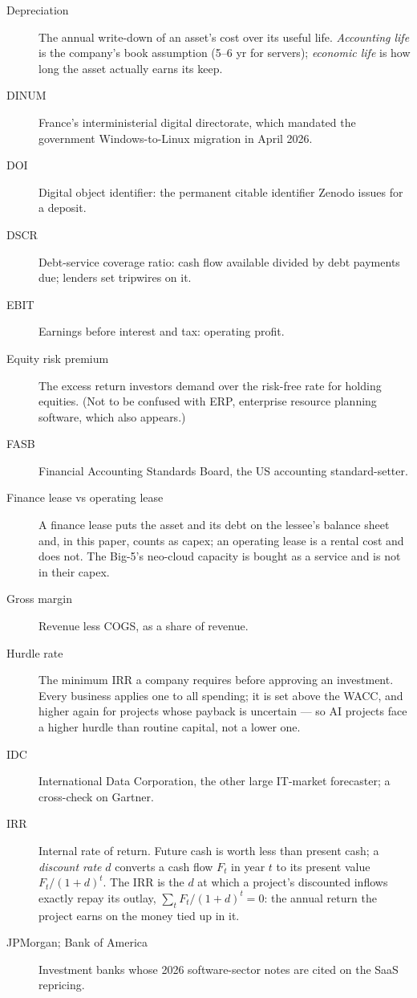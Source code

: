 \documentclass[11pt,letterpaper]{article}
\begin{document}
\begin{description}
\item[Depreciation] The annual write-down of an asset's cost over its useful life. \emph{Accounting life} is the company's book assumption (5--6 yr for servers); \emph{economic life} is how long the asset actually earns its keep.
\item[DINUM] France's interministerial digital directorate, which mandated the government Windows-to-Linux migration in April 2026.
\item[DOI] Digital object identifier: the permanent citable identifier Zenodo issues for a deposit.
\item[DSCR] Debt-service coverage ratio: cash flow available divided by debt payments due; lenders set tripwires on it.
\item[EBIT] Earnings before interest and tax: operating profit.
\item[Equity risk premium] The excess return investors demand over the risk-free rate for holding equities. (Not to be confused with ERP, enterprise resource planning software, which also appears.)
\item[FASB] Financial Accounting Standards Board, the US accounting standard-setter.
\item[Finance lease vs operating lease] A finance lease puts the asset and its debt on the lessee's balance sheet and, in this paper, counts as capex; an operating lease is a rental cost and does not. The Big-5's neo-cloud capacity is bought as a service and is not in their capex.
\item[Gross margin] Revenue less COGS, as a share of revenue.
\item[Hurdle rate] The minimum IRR a company requires before approving an investment. Every business applies one to all spending; it is set above the WACC, and higher again for projects whose payback is uncertain --- so AI projects face a higher hurdle than routine capital, not a lower one.
\item[IDC] International Data Corporation, the other large IT-market forecaster; a cross-check on Gartner.
\item[IRR] Internal rate of return. Future cash is worth less than present cash; a \emph{discount rate} $d$ converts a cash flow $F_t$ in year $t$ to its present value $F_t/(1+d)^t$. The IRR is the $d$ at which a project's discounted inflows exactly repay its outlay, $\sum_t F_t/(1+d)^t=0$: the annual return the project earns on the money tied up in it.
\item[JPMorgan; Bank of America] Investment banks whose 2026 software-sector notes are cited on the SaaS repricing.

\end{description}
\end{document}

